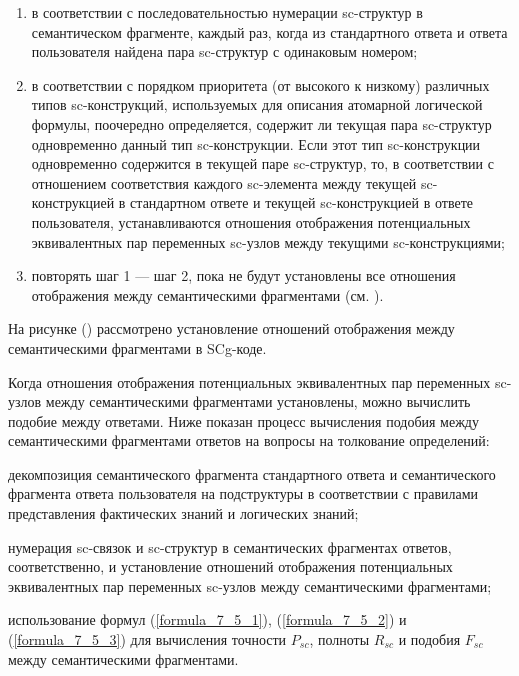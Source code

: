 \begin{enumerate}
	\item в соответствии с последовательностью нумерации sc-структур в семантическом фрагменте, каждый раз, когда из стандартного ответа и ответа пользователя найдена пара sc-структур с одинаковым номером;
	\item в соответствии с порядком приоритета (от высокого к низкому) различных типов sc-конструкций, используемых для описания атомарной логической формулы, поочередно определяется, содержит ли текущая пара sc-структур одновременно данный тип sc-конструкции. Если этот тип sc-конструкции одновременно содержится в текущей паре sc-структур, то, в соответствии с отношением соответствия каждого sc-элемента между текущей sc-конструкцией в стандартном ответе и текущей sc-конструкцией в ответе пользователя, устанавливаются отношения отображения потенциальных эквивалентных пар переменных sc-узлов между текущими sc-конструкциями;
	\item повторять шаг 1 --- шаг 2, пока не будут установлены все отношения отображения между семантическими фрагментами (см. ).
\end{enumerate}

На рисунке (\textit{}) рассмотрено установление отношений отображения между семантическими фрагментами в SCg-коде.

Когда отношения отображения потенциальных эквивалентных пар переменных sc-узлов между семантическими фрагментами установлены, можно вычислить подобие между ответами. Ниже показан процесс вычисления подобия между семантическими фрагментами ответов на вопросы на толкование определений:

\begin{textitemize}
	\item декомпозиция семантического фрагмента стандартного ответа и семантического фрагмента ответа пользователя на подструктуры в соответствии с правилами представления фактических знаний и логических знаний;
	\item нумерация sc-связок и sc-структур в семантических фрагментах ответов, соответственно, и установление отношений отображения потенциальных эквивалентных пар переменных sc-узлов между семантическими фрагментами;
	\item использование формул (\ref{formula_7_5_1}), (\ref{formula_7_5_2}) и (\ref{formula_7_5_3}) для вычисления точности $P_{sc}$, полноты $R_{sc}$ и подобия $F_{sc}$ между семантическими фрагментами. 
\end{textitemize}

